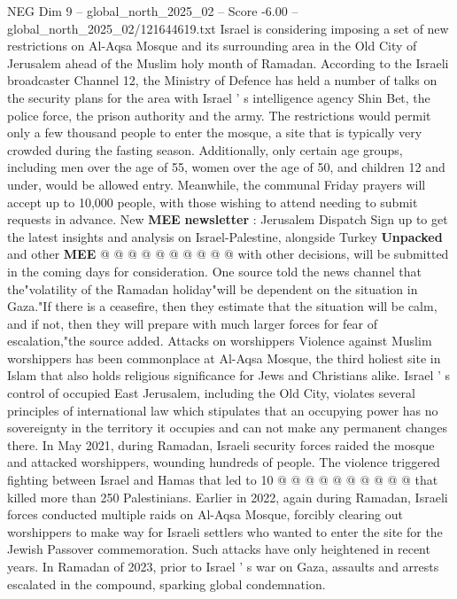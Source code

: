 \begin{textsample}{NEG Dim 9 – global\_north\_2025\_02 – Score -6.00 – global\_north\_2025\_02/121644619.txt}  \label{ex:f9_neg_012}
Israel is considering imposing a set of new restrictions on Al-Aqsa Mosque and its surrounding area in the Old City of Jerusalem ahead of the Muslim holy month of Ramadan.
According to the Israeli broadcaster Channel 12, the Ministry of Defence has held a number of talks on the security plans for the area with Israel ' s intelligence agency Shin Bet, the police force, the prison authority and the army.
The restrictions would permit only a few thousand people to enter the mosque, a site that is typically very crowded during the fasting season.
Additionally, only certain age groups, including men over the age of 55, women over the age of 50, and children 12 and under, would be allowed entry.
Meanwhile, the communal Friday prayers will accept up to 10,000 people, with those wishing to attend needing to submit requests in advance.
New \textbf{MEE} \textbf{newsletter} : Jerusalem Dispatch Sign up to get the latest insights and analysis on Israel-Palestine, alongside Turkey \textbf{Unpacked} and other \textbf{MEE} @ @ @ @ @ @ @ @ @ @ with other decisions, will be submitted in the coming days for consideration.
One source told the news channel that the"volatility of the Ramadan holiday"will be dependent on the situation in Gaza."If there is a ceasefire, then they estimate that the situation will be calm, and if not, then they will prepare with much larger forces for fear of escalation,"the source added.
Attacks on worshippers Violence against Muslim worshippers has been commonplace at Al-Aqsa Mosque, the third holiest site in Islam that also holds religious significance for Jews and Christians alike.
Israel ' s control of occupied East Jerusalem, including the Old City, violates several principles of international law which stipulates that an occupying power has no sovereignty in the territory it occupies and can not make any permanent changes there.
In May 2021, during Ramadan, Israeli security forces raided the mosque and attacked worshippers, wounding hundreds of people.
The violence triggered fighting between Israel and Hamas that led to 10 @ @ @ @ @ @ @ @ @ @ that killed more than 250 Palestinians.
Earlier in 2022, again during Ramadan, Israeli forces conducted multiple raids on Al-Aqsa Mosque, forcibly clearing out worshippers to make way for Israeli settlers who wanted to enter the site for the Jewish Passover commemoration.
Such attacks have only heightened in recent years.
In Ramadan of 2023, prior to Israel ' s war on Gaza, assaults and arrests escalated in the compound, sparking global condemnation.

\end{textsample}
